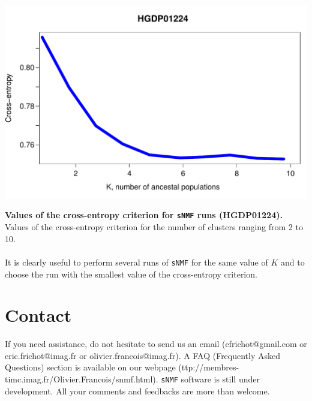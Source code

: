 \documentclass[10pt,a4paper]{article}
\begin{document}
\centerline{\includegraphics[width=15cm]{ce.pdf}}
  {\bf Values of the cross-entropy criterion for {\tt sNMF} runs (HGDP01224).} Values of the cross-entropy criterion for the number of clusters ranging from 2 to 10.
\\
\\
 It is clearly useful to perform several runs of {\tt sNMF} for the same value of $K$ and to choose the run with the smallest value of the cross-entropy criterion.



\section{Contact}
If you need assistance, do not hesitate to send us an email (efrichot@gmail.com or eric.frichot@imag.fr or olivier.francois@imag.fr). 
A FAQ (Frequently Asked Questions) section is available 
on our webpage (ttp://membres-timc.imag.fr/Olivier.Francois/snmf.html). 
{\tt sNMF} software is still under development. All your comments and feedbacks are more than welcome.



\end{document}
